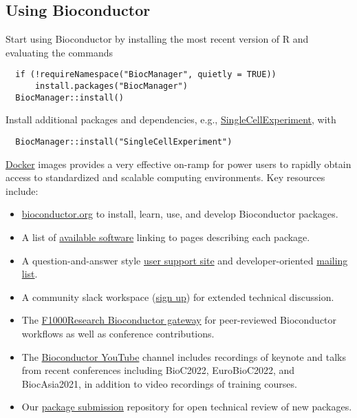 \hypertarget{using-bioconductor}{%
\subsection{Using Bioconductor}\label{using-bioconductor}}

Start using
Bioconductor by installing the most recent version of R and evaluating
the commands

\begin{verbatim}
  if (!requireNamespace("BiocManager", quietly = TRUE))
      install.packages("BiocManager")
  BiocManager::install()
\end{verbatim}

Install additional packages and dependencies,
e.g., \href{https://bioconductor.org/packages/SingleCellExperiment}{SingleCellExperiment}, with

\begin{verbatim}
  BiocManager::install("SingleCellExperiment")
\end{verbatim}

\href{https://bioconductor.org/help/docker/}{Docker}
images provides a very effective on-ramp for power users to rapidly
obtain access to standardized and scalable computing environments.
Key resources include:

\begin{itemize}
\tightlist
\item
  \href{https://bioconductor.org}{bioconductor.org} to install,
  learn, use, and develop Bioconductor packages.
\item
  A list of \href{https://bioconductor.org/packages}{available software}
  linking to pages describing each package.
\item
  A question-and-answer style
  \href{https://support.bioconductor.org}{user support site} and
  developer-oriented \href{https://stat.ethz.ch/mailman/listinfo/bioc-devel}{mailing list}.
\item
  A community slack workspace (\href{https://slack.bioconductor.org}{sign up})
  for extended technical discussion.
\item
  The \href{https://f1000research.com/gateways/bioconductor}{F1000Research Bioconductor gateway}
  for peer-reviewed Bioconductor workflows as well as conference contributions.
\item
  The \href{https://www.youtube.com/user/bioconductor}{Bioconductor YouTube}
  channel includes recordings of keynote and talks from recent
  conferences including BioC2022, EuroBioC2022, and BiocAsia2021, in addition to
  video recordings of training courses.
\item
  Our \href{https://github.com/Bioconductor/Contributions}{package submission}
  repository for open technical review of new packages.
\end{itemize}

